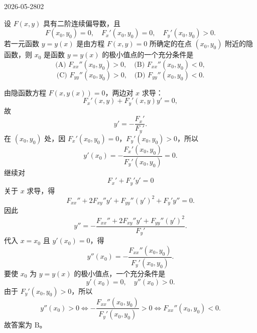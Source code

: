 \begin{mistake}{2026-05-28}{02}

\begin{problemcontent}
设 \(F(x,y)\) 具有二阶连续偏导数，且
\[
F(x_0,y_0)=0,\quad F_x'(x_0,y_0)=0,\quad F_y'(x_0,y_0)>0.
\]
若一元函数 \(y=y(x)\) 是由方程 \(F(x,y)=0\) 所确定的在点 \((x_0,y_0)\) 附近的隐函数，则 \(x_0\) 是函数 \(y=y(x)\) 的极小值点的一个充分条件是
\[
\text{(A) }F_{xx}''(x_0,y_0)>0,\quad
\text{(B) }F_{xx}''(x_0,y_0)<0,
\]
\[
\text{(C) }F_{yy}''(x_0,y_0)>0,\quad
\text{(D) }F_{yy}''(x_0,y_0)<0.
\]
\end{problemcontent}

\begin{solutioncontent}
由隐函数方程 \(F(x,y(x))=0\)，两边对 \(x\) 求导：
\[
F_x'(x,y)+F_y'(x,y)y'=0,
\]
故
\[
y'=-\frac{F_x'}{F_y'}.
\]
在 \((x_0,y_0)\) 处，因 \(F_x'(x_0,y_0)=0\)，\(F_y'(x_0,y_0)>0\)，所以
\[
y'(x_0)=-\frac{F_x'(x_0,y_0)}{F_y'(x_0,y_0)}=0.
\]
继续对
\[
F_x'+F_y'y'=0
\]
关于 \(x\) 求导，得
\[
F_{xx}''+2F_{xy}''y'+F_{yy}''(y')^2+F_y'y''=0.
\]
因此
\[
y''=-\frac{F_{xx}''+2F_{xy}''y'+F_{yy}''(y')^2}{F_y'}.
\]
代入 \(x=x_0\) 且 \(y'(x_0)=0\)，得
\[
y''(x_0)=-\frac{F_{xx}''(x_0,y_0)}{F_y'(x_0,y_0)}.
\]
要使 \(x_0\) 为 \(y=y(x)\) 的极小值点，一个充分条件是
\[
y'(x_0)=0,\quad y''(x_0)>0.
\]
由于 \(F_y'(x_0,y_0)>0\)，所以
\[
y''(x_0)>0
\Longleftrightarrow
-\frac{F_{xx}''(x_0,y_0)}{F_y'(x_0,y_0)}>0
\Longleftrightarrow
F_{xx}''(x_0,y_0)<0.
\]
故答案为 \(\mathrm{B}\)。
\end{solutioncontent}


\end{mistake}
